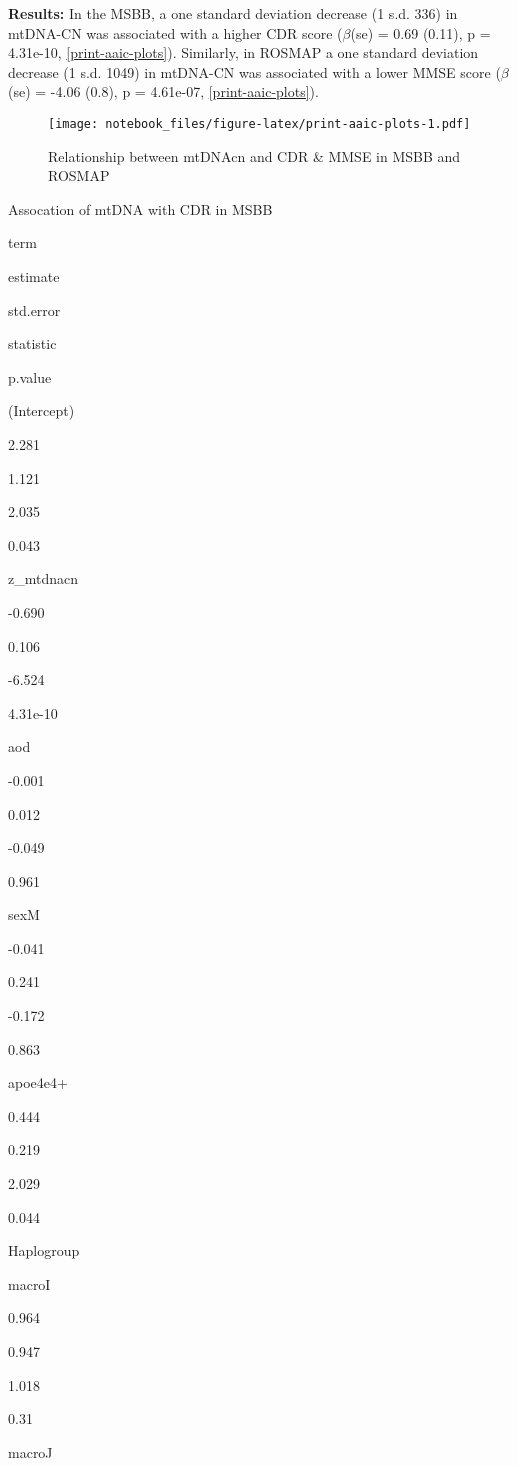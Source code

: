 \documentclass[]{book}
\begin{document}
\textbf{Results:} In the MSBB, a one standard deviation decrease (1 s.d. 336) in mtDNA-CN was associated with a higher CDR score (\(\beta\)(se) = 0.69 (0.11), p = 4.31e-10, \ref{print-aaic-plots}). Similarly, in ROSMAP a one standard deviation decrease (1 s.d. 1049) in mtDNA-CN was associated with a lower MMSE score (\(\beta\)(se) = -4.06 (0.8), p = 4.61e-07, \ref{print-aaic-plots}).

\begin{figure}
\centering
\texttt{[image: notebook\_files/figure-latex/print-aaic-plots-1.pdf]}
\caption{\label{fig:print-aaic-plots}Relationship between mtDNAcn and CDR \& MMSE in MSBB and ROSMAP}
\end{figure}

\label{tab:aaic-tab-cdr}Assocation of mtDNA with CDR in MSBB

term

estimate

std.error

statistic

p.value

(Intercept)

2.281

1.121

2.035

0.043

z\_mtdnacn

-0.690

0.106

-6.524

4.31e-10

aod

-0.001

0.012

-0.049

0.961

sexM

-0.041

0.241

-0.172

0.863

apoe4e4+

0.444

0.219

2.029

0.044

Haplogroup

macroI

0.964

0.947

1.018

0.31

macroJ
\end{document}
